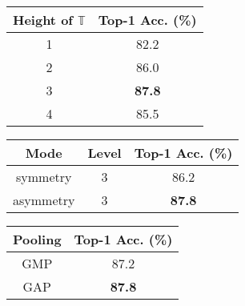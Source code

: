 \documentclass[10pt,twocolumn,letterpaper]{article}
\begin{document}
\begin{table*}[t]
    \begin{minipage}{0.33\linewidth}
    \centering
    { \setlength{\tabcolsep}{6.5pt}
    \caption{Effect of the height of the tree $\mathbb{T}$.}
    \vspace{-2mm}
    \label{tab:leaf-node}    
    \begin{tabular}{cc}
    	\toprule
    	Height of $\mathbb{T}$ & Top-1 Acc. (\%) \\ \midrule
    	        1          &      82.2       \\
    	        2          &      86.0       \\
    	        3          &    \bf{87.8}    \\
    	        4          &      85.5       \\ \bottomrule
    \end{tabular}}    
    \end{minipage}
   \begin{minipage}{0.33\linewidth}
    \centering
    { \setlength{\tabcolsep}{3.5pt}
    \renewcommand\arraystretch{1.6}
    \caption{Effect of tree architecture.}
     \vspace{-2mm}
    \label{tab:asymmetry}    
    \begin{tabular}{ccc}
    	\toprule
    	  Mode    & Level & Top-1 Acc. (\%) \\ \midrule
    	symmetry  &   3   &      86.2       \\
    	asymmetry &   3   &    \bf{87.8}    \\ \bottomrule
    \end{tabular}}
    \end{minipage}
    \begin{minipage}{0.33\linewidth}
    \centering
    {\setlength{\tabcolsep}{8.5pt}
    \renewcommand\arraystretch{1.55}
     \vspace{-2mm}
    \caption{Comparison between GMP and GAP.}
    \label{tab:pooling}    
    \begin{tabular}{cc}
    	\toprule
    	Pooling & Top-1 Acc. (\%) \\ \midrule
    	  GMP   &      87.2       \\
    	  GAP   &    \bf{87.8}    \\ \bottomrule
    \end{tabular}}    
    \end{minipage}
    \vspace{-2mm}
\end{table*}
\end{document}
